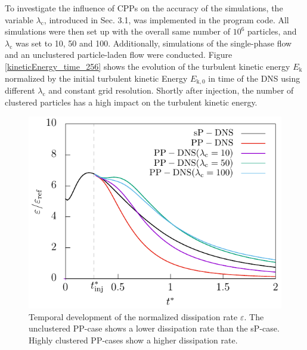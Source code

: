 \documentclass[11pt,a4paper,openany,oneside,parskip=half*]{article}
\begin{document}
To investigate the influence of CPPs on the accuracy of the simulations, the variable $\lambda_\mathrm{c}$, introduced in Sec. 3.1, was implemented in the program code. All simulations were then set up with the overall same number of $10^6$ particles, and $\lambda_\mathrm{c}$ was set to 10, 50 and 100. Additionally, simulations of the single-phase flow and an unclustered particle-laden flow were conducted.
\newline %
Figure \ref{kineticEnergy_time_256} shows the evolution of the turbulent kinetic energy $E_\mathrm{k}$ normalized by the initial turbulent kinetic Energy $E_\mathrm{k,0}$ in time of the DNS using different $\lambda_\mathrm{c}$ and constant grid resolution. Shortly after injection, the number of clustered particles has a high impact on the turbulent kinetic energy. 
\begin{figure}[htb]
    \centering
    \begin{minipage}[t]{0.5\textwidth}
         \centering
        \includegraphics[width=\linewidth]{./Abbildungen/256/diss_time.pdf}
        \caption{Temporal development of the normalized dissipation rate $\varepsilon$. The unclustered PP-case shows a lower dissipation rate than the sP-case. Highly clustered PP-cases show a higher dissipation rate.}
        \label{diss_time_256}
    \end{minipage}%
    \begin{minipage}[t]{0.5\textwidth}
        \centering

\end{minipage}
\end{figure}
\end{document}
